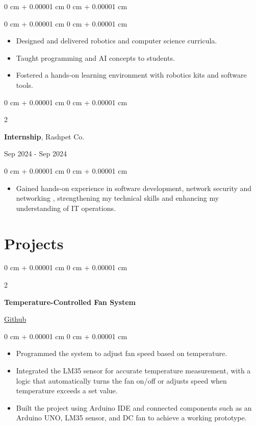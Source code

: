 \documentclass[10pt, letterpaper]{article}
\newenvironment{highlights}{
    \begin{itemize}[
        topsep=0.10 cm,
        parsep=0.10 cm,
        partopsep=0pt,
        itemsep=0pt,
        leftmargin=0 cm + 10pt
    ]
}{
    \end{itemize}
} %
\newenvironment{onecolentry}{
    \begin{adjustwidth}{
        0 cm + 0.00001 cm
    }{
        0 cm + 0.00001 cm
    }
}{
    \end{adjustwidth}
} %
\newenvironment{twocolentry}[2][]{
    \onecolentry
    \def\secondColumn{#2}
    \setcolumnwidth{\fill, 4.5 cm}
    \begin{paracol}{2}
}{
    \switchcolumn \raggedleft \secondColumn
    \end{paracol}
    \endonecolentry
} %
\begin{document}
\begin{onecolentry}
\begin{onecolentry}
\begin{highlights}
                    \item Designed and delivered robotics and computer science curricula.
                    \item Taught programming and AI concepts to students.
                    \item Fostered a hands-on learning environment with robotics kits and software tools.
                \end{highlights}
            \end{onecolentry}
            
            \begin{twocolentry}{
                Sep 2024 - Sep 2024
            }
                \textbf{Internship}, Rashpet Co.
            \end{twocolentry}

            \vspace{0.10 cm}
            \begin{onecolentry}
                \begin{highlights}
                    
                    \item Gained hands-on experience in software development, network security and networking , strengthening my technical skills and enhancing my understanding of IT operations.
                \end{highlights}
            \end{onecolentry}
            
    \section{Projects}

        
            \begin{twocolentry}{
                \href{}{Github}
            }
                \textbf{Temperature-Controlled Fan System}
            \end{twocolentry}

            \vspace{0.10 cm}
            \begin{onecolentry}
                \begin{highlights}
                    \item Programmed the system to adjust fan speed based on temperature.
                    \item Integrated the LM35 sensor for accurate temperature measurement, with a logic that automatically turns the fan on/off or adjusts speed when temperature exceeds a set value.
                    \item Built the project using Arduino IDE and connected components such as an Arduino UNO, LM35 sensor, and DC fan to achieve a working prototype.
                \end{highlights}
            \end{onecolentry}
            

\end{onecolentry}
\end{document}
